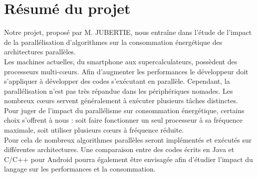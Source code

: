 \chapter{Résumé du projet}

Notre projet, proposé par M. JUBERTIE, nous entraîne dans l'étude de l'impact de la parallélisation d'algorithmes sur la consommation énergétique des architectures parallèles.\\ 

Les machines actuelles, du smartphone aux supercalculateurs, possèdent des 
processeurs multi-c\oe{}urs. Afin d'augmenter les performances le développeur doit s'appliquer à développer des codes s'exécutant en parallèle. Cependant, la parallélisation n'est pas très répandue dans les périphériques nomades. Les nombreux c\oe{}urs servent généralement à exécuter plusieurs tâches distinctes. \\

Pour juger de l'impact du parallélisme sur consommation énergétique, certains choix s'offrent à nous  : soit faire fonctionner un seul processeur à sa fréquence 
maximale, soit utiliser plusieurs c\oe{}urs à fréquence réduite. \\

Pour cela de nombreux algorithmes parallèles seront implémentés et exécutés sur différentes architectures.
Une comparaison entre des codes écrits en Java et C/C++ pour Android pourra 
également être envisagée afin d'étudier l'impact du langage sur les 
performances et la consommation. \\ 
